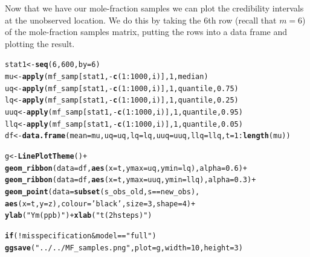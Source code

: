 \documentclass[a4paper,11pt]{article}\usepackage[]{graphicx}\usepackage[]{color}
\makeatletter
\newcommand{\hlnum}[1]{\textcolor[rgb]{0.686,0.059,0.569}{#1}}%
\newcommand{\hlstr}[1]{\textcolor[rgb]{0.192,0.494,0.8}{#1}}%
\newcommand{\hlopt}[1]{\textcolor[rgb]{0,0,0}{#1}}%
\newcommand{\hlstd}[1]{\textcolor[rgb]{0.345,0.345,0.345}{#1}}%
\newcommand{\hlkwa}[1]{\textcolor[rgb]{0.161,0.373,0.58}{\textbf{#1}}}%
\newcommand{\hlkwb}[1]{\textcolor[rgb]{0.69,0.353,0.396}{#1}}%
\newcommand{\hlkwc}[1]{\textcolor[rgb]{0.333,0.667,0.333}{#1}}%
\newcommand{\hlkwd}[1]{\textcolor[rgb]{0.737,0.353,0.396}{\textbf{#1}}}%
\newenvironment{kframe}{%
 \def\at@end@of@kframe{}%
 \ifinner\ifhmode%
  \def\at@end@of@kframe{\end{minipage}}%
  \begin{minipage}{\columnwidth}%
 \fi\fi%
 \def\FrameCommand##1{\hskip\@totalleftmargin \hskip-\fboxsep
 \colorbox{shadecolor}{##1}\hskip-\fboxsep
     \hskip-\linewidth \hskip-\@totalleftmargin \hskip\columnwidth}%
 \MakeFramed {\advance\hsize-\width
   \@totalleftmargin\z@ \linewidth\hsize
   \@setminipage}}%
 {\par\unskip\endMakeFramed%
 \at@end@of@kframe}
\newenvironment{knitrout}{}{} %
\makeatother
\begin{document}
Now that we have our mole-fraction samples we can plot the credibility intervals at the unobserved location. We do this by taking the 6th row (recall that $m = 6$) of the mole-fraction samples matrix, putting the rows into a data frame and plotting the result.
\begin{knitrout}
\color{fgcolor}\begin{kframe}
\begin{alltt}
\hlstd{stat1} \hlkwb{<-}  \hlkwd{seq}\hlstd{(}\hlnum{6}\hlstd{,}\hlnum{600}\hlstd{,}\hlkwc{by}\hlstd{=}\hlnum{6}\hlstd{)}
\hlstd{mu} \hlkwb{<-} \hlkwd{apply}\hlstd{(mf_samp[stat1,}\hlopt{-}\hlkwd{c}\hlstd{(}\hlnum{1}\hlopt{:}\hlnum{1000}\hlstd{,i)],}\hlnum{1}\hlstd{,median)}
\hlstd{uq} \hlkwb{<-} \hlkwd{apply}\hlstd{(mf_samp[stat1,}\hlopt{-}\hlkwd{c}\hlstd{(}\hlnum{1}\hlopt{:}\hlnum{1000}\hlstd{,i)],}\hlnum{1}\hlstd{,quantile,}\hlnum{0.75}\hlstd{)}
\hlstd{lq} \hlkwb{<-} \hlkwd{apply}\hlstd{(mf_samp[stat1,}\hlopt{-}\hlkwd{c}\hlstd{(}\hlnum{1}\hlopt{:}\hlnum{1000}\hlstd{,i)],}\hlnum{1}\hlstd{,quantile,}\hlnum{0.25}\hlstd{)}
\hlstd{uuq} \hlkwb{<-} \hlkwd{apply}\hlstd{(mf_samp[stat1,}\hlopt{-}\hlkwd{c}\hlstd{(}\hlnum{1}\hlopt{:}\hlnum{1000}\hlstd{,i)],}\hlnum{1}\hlstd{,quantile,}\hlnum{0.95}\hlstd{)}
\hlstd{llq} \hlkwb{<-} \hlkwd{apply}\hlstd{(mf_samp[stat1,}\hlopt{-}\hlkwd{c}\hlstd{(}\hlnum{1}\hlopt{:}\hlnum{1000}\hlstd{,i)],}\hlnum{1}\hlstd{,quantile,}\hlnum{0.05}\hlstd{)}
\hlstd{df} \hlkwb{<-} \hlkwd{data.frame}\hlstd{(}\hlkwc{mean} \hlstd{= mu,} \hlkwc{uq}\hlstd{=uq,}\hlkwc{lq}\hlstd{=lq,}\hlkwc{uuq}\hlstd{=uuq,}\hlkwc{llq}\hlstd{=llq,}\hlkwc{t}\hlstd{=}\hlnum{1}\hlopt{:}\hlkwd{length}\hlstd{(mu))}

\hlstd{g} \hlkwb{<-} \hlkwd{LinePlotTheme}\hlstd{()} \hlopt{+}
  \hlkwd{geom_ribbon}\hlstd{(}\hlkwc{data}\hlstd{=df,}\hlkwd{aes}\hlstd{(}\hlkwc{x}\hlstd{=t,}\hlkwc{ymax}\hlstd{=uq,}\hlkwc{ymin}\hlstd{=lq),}\hlkwc{alpha}\hlstd{=}\hlnum{0.6}\hlstd{)} \hlopt{+}
  \hlkwd{geom_ribbon}\hlstd{(}\hlkwc{data}\hlstd{=df,}\hlkwd{aes}\hlstd{(}\hlkwc{x}\hlstd{=t,}\hlkwc{ymax}\hlstd{=uuq,}\hlkwc{ymin}\hlstd{=llq),}\hlkwc{alpha}\hlstd{=}\hlnum{0.3}\hlstd{)} \hlopt{+}
  \hlkwd{geom_point}\hlstd{(}\hlkwc{data}\hlstd{=}\hlkwd{subset}\hlstd{(s_obs_old,s}\hlopt{==}\hlstd{new_obs),}
             \hlkwd{aes}\hlstd{(}\hlkwc{x}\hlstd{=t,}\hlkwc{y} \hlstd{= z),}\hlkwc{colour}\hlstd{=}\hlstr{'black'}\hlstd{,}\hlkwc{size}\hlstd{=}\hlnum{3}\hlstd{,}\hlkwc{shape}\hlstd{=}\hlnum{4}\hlstd{)}\hlopt{+}
    \hlkwd{ylab}\hlstd{(}\hlstr{"Ym (ppb)"}\hlstd{)} \hlopt{+} \hlkwd{xlab}\hlstd{(}\hlstr{"t (2 h steps)"}\hlstd{)}

\hlkwa{if}\hlstd{(}\hlopt{!}\hlstd{misspecification} \hlopt{&} \hlstd{model}\hlopt{==}\hlstr{"full"}\hlstd{)}
  \hlkwd{ggsave}\hlstd{(}\hlstr{"../../MF_samples.png"}\hlstd{,}\hlkwc{plot} \hlstd{= g,}\hlkwc{width}\hlstd{=}\hlnum{10}\hlstd{,}\hlkwc{height}\hlstd{=}\hlnum{3}\hlstd{)}
\end{alltt}
\end{kframe}
\end{knitrout}
\end{document}

